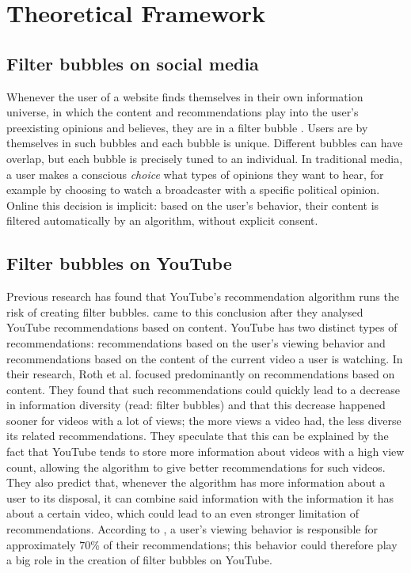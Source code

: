 \documentclass[../main.tex]{subfiles}
\begin{document}
\section{Theoretical Framework}
\subsection{Filter bubbles on social media}
Whenever the user of a website finds themselves in their own information universe, in which the content
and recommendations play into the user's preexisting opinions and believes, they are in a filter bubble
\citep{pariser2011filter}. Users are by themselves in such bubbles and each bubble is unique. Different
bubbles can have overlap, but each bubble is precisely tuned to an individual. In traditional media, a
user makes a conscious \textit{choice} what types of opinions they want to hear, for example by choosing
to watch a broadcaster with a specific political opinion. Online this decision is implicit: based on the
user's behavior, their content is filtered automatically by an algorithm, without explicit consent. 


\subsection{Filter bubbles on YouTube}
Previous research has found that YouTube's recommendation algorithm runs the risk of creating filter
bubbles. \citet{roth2020tubes} came to this conclusion after they analysed YouTube recommendations based
on content. YouTube has two distinct types of recommendations: recommendations based on the user's
viewing behavior and recommendations based on the content of the current video a user is watching. In
their research, Roth et al. focused predominantly on recommendations based on content. They found that
such recommendations could quickly lead to a decrease in information diversity (read: filter bubbles)
and that this decrease happened sooner for videos with a lot of views; the more views a video had, the
less diverse its related recommendations. They speculate that this can be explained by the fact that
YouTube tends to store more information about videos with a high view count, allowing the algorithm to
give better recommendations for such videos. They also predict that, whenever the algorithm has more
information about a user to its disposal, it can combine said information with the information it has
about a certain video, which could lead to an even stronger limitation of recommendations. According to
\citet{ledwich2019algorithmic}, a user's viewing behavior is responsible for approximately 70\% of their
recommendations; this behavior could therefore play a big role in the creation of filter bubbles on
YouTube. 
\end{document}

